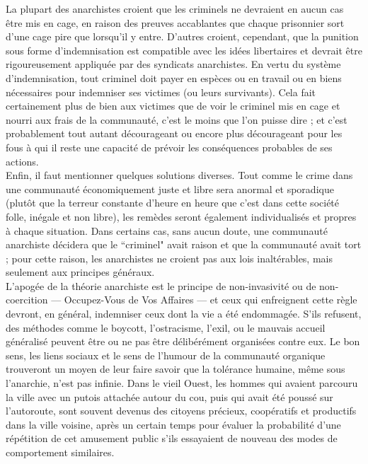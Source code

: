La plupart des anarchistes croient que les criminels ne devraient en aucun cas être mis en cage, en raison des preuves accablantes que chaque prisonnier sort d'une cage pire que lorsqu'il y entre. D'autres croient, cependant, que la punition sous forme d'indemnisation est compatible avec les idées libertaires et devrait être rigoureusement appliquée par des syndicats anarchistes. En vertu du système d'indemnisation, tout criminel doit payer en espèces ou en travail ou en biens nécessaires pour indemniser ses victimes (ou leurs survivants). Cela fait certainement plus de bien aux victimes que de voir le criminel mis en cage et nourri aux frais de la communauté, c'est le moins que l'on puisse dire ; et c'est probablement tout autant décourageant ou encore plus décourageant pour les fous à qui il reste une capacité de prévoir les conséquences probables de ses actions.\\
Enfin, il faut mentionner quelques solutions diverses. Tout comme le crime dans une communauté économiquement juste et libre sera anormal et sporadique (plutôt que la terreur constante d'heure en heure que c'est dans cette société folle, inégale et non libre), les remèdes seront également individualisés et propres à chaque situation. Dans certains cas, sans aucun doute, une communauté anarchiste décidera que le ``criminel" avait raison et que la communauté avait tort ; pour cette raison, les anarchistes ne croient pas aux lois inaltérables, mais seulement aux principes généraux.\\
L'apogée de la théorie anarchiste est le principe de non-invasivité ou de non-coercition --- Occupez-Vous de Vos Affaires --- et ceux qui enfreignent cette règle devront, en général, indemniser ceux dont la vie a été endommagée. S'ils refusent, des méthodes comme le boycott, l'ostracisme, l'exil, ou le mauvais accueil généralisé peuvent être ou ne pas être délibérément organisées contre eux. Le bon sens, les liens sociaux et le sens de l'humour de la communauté organique trouveront un moyen de leur faire savoir que la tolérance humaine, même sous l'anarchie, n'est pas infinie. Dans le vieil Ouest, les hommes qui avaient parcouru la ville avec un putois attachée autour du cou, puis qui avait été poussé sur l'autoroute, sont souvent devenus des citoyens précieux, coopératifs et productifs dans la ville voisine, après un certain temps pour évaluer la probabilité d'une répétition de cet amusement public s'ils essayaient de nouveau des modes de comportement similaires.